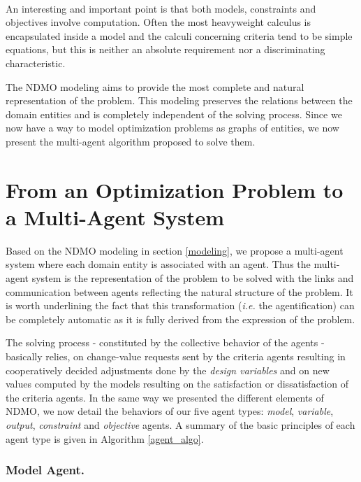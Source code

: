 
\paragraph*{}
An interesting and important point is that both models, constraints and objectives involve computation. Often the most heavyweight calculus is encapsulated inside a model and the calculi concerning criteria tend to be simple equations, but this is neither an absolute requirement nor a discriminating characteristic.

The NDMO modeling aims to provide the most complete and natural representation of the problem. This modeling preserves the relations between the domain entities and is completely independent of the solving process. 
Since we now have a way to model optimization problems as graphs of entities, we now present the multi-agent algorithm proposed to solve them.

\section{From an Optimization Problem to a Multi-Agent System}

Based on the NDMO modeling in section \ref{modeling}, we propose a multi-agent system where each domain entity is associated with an agent. Thus the multi-agent system is the representation of the problem to be solved with the links and communication between agents reflecting the natural structure of the problem. It is worth underlining the fact that this transformation (\textit{i.e.} the agentification) can be completely automatic as it is fully derived from the expression of the problem.

The solving process - constituted by the collective behavior of the agents - basically relies, on change-value requests sent by the criteria agents resulting in cooperatively decided adjustments done by the \emph{design variables} and on new values computed by the models resulting on the satisfaction or dissatisfaction of the criteria agents. 
In the same way we presented the different elements of NDMO, we now detail the behaviors of our five agent types: \emph{model}, \emph{variable}, \emph{output}, \emph{constraint} and \emph{objective} agents.
A summary of the basic principles of each agent type is given in Algorithm \ref{agent_algo}.

\subsubsection*{Model Agent.}

